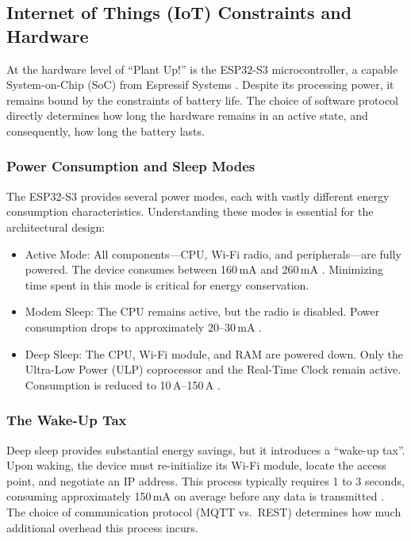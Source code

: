 \subsection{Internet of Things (IoT) Constraints and Hardware}
At the hardware level of ``Plant Up!'' is the ESP32-S3 microcontroller, a capable System-on-Chip (SoC) from Espressif Systems \cite{esp32s3Datasheet}. Despite its processing power, it remains bound by the constraints of battery life. The choice of software protocol directly determines how long the hardware remains in an active state, and consequently, how long the battery lasts.

\subsubsection{Power Consumption and Sleep Modes}
The ESP32-S3 provides several power modes, each with vastly different energy consumption characteristics. Understanding these modes is essential for the architectural design:
\begin{itemize}
    \item Active Mode: All components---CPU, Wi-Fi radio, and peripherals---are fully powered. The device consumes between 160\,mA and 260\,mA \cite{lastMinuteActive}. Minimizing time spent in this mode is critical for energy conservation.
    \item Modem Sleep: The CPU remains active, but the radio is disabled. Power consumption drops to approximately 20--30\,mA \cite{lastMinuteActive}.
    \item Deep Sleep: The CPU, Wi-Fi module, and RAM are powered down. Only the Ultra-Low Power (ULP) coprocessor and the Real-Time Clock remain active. Consumption is reduced to 10\,\textmu A--150\,\textmu A \cite{esp32s3Datasheet}.
\end{itemize}

\subsubsection{The Wake-Up Tax}
Deep sleep provides substantial energy savings, but it introduces a ``wake-up tax''. Upon waking, the device must re-initialize its Wi-Fi module, locate the access point, and negotiate an IP address. This process typically requires 1 to 3 seconds, consuming approximately 150\,mA on average before any data is transmitted \cite{adafruitWake}. The choice of communication protocol (MQTT vs.\ REST) determines how much additional overhead this process incurs.

